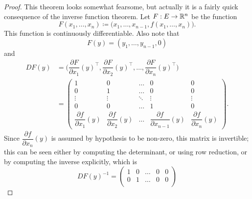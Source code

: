 \begin{proof}
  This theorem looks somewhat fearsome, but actually it is a fairly quick consequence of the inverse function theorem.
  Let \(F : E \to \mathbb{R}^n\) be the function
  \[
    F(x_1, \dots, x_n) \coloneqq \big(x_1, \dots, x_{n - 1}, f(x_1, \dots, x_n)\big).
  \]
  This function is continuously differentiable.
  Also note that
  \[
    F(y) = (y_1, \dots, y_{n - 1}, 0)
  \]
  and
  \begin{align*}
    D F(y) & = \bigg(\dfrac{\partial F}{\partial x_1}(y)^\top, \dfrac{\partial F}{\partial x_2}(y)^\top, \dots, \dfrac{\partial F}{\partial x_n}(y)^\top\bigg)                                          \\
           & = \begin{pmatrix}
                 1                                   & 0                                   & \dots  & 0                                         & 0                                   \\
                 0                                   & 1                                   & \dots  & 0                                         & 0                                   \\
                 \vdots                              & \vdots                              & \ddots & \vdots                                    & \vdots                              \\
                 0                                   & 0                                   & \dots  & 1                                         & 0                                   \\
                 \dfrac{\partial f}{\partial x_1}(y) & \dfrac{\partial f}{\partial x_2}(y) & \dots  & \dfrac{\partial f}{\partial x_{n - 1}}(y) & \dfrac{\partial f}{\partial x_n}(y)
               \end{pmatrix}.
  \end{align*}
  Since \(\dfrac{\partial f}{\partial x_n}(y)\) is assumed by hypothesis to be non-zero, this matrix is invertible;
  this can be seen either by computing the determinant, or using row reduction, or by computing the inverse explicitly, which is
  \[
    D F(y)^{-1} = \begin{pmatrix}
      1                                        & 0                                        & \dots  & 0                                              & 0      \\
      0                                        & 1                                        & \dots  & 0                                              & 0      \\

\end{pmatrix}\]
\end{proof}
